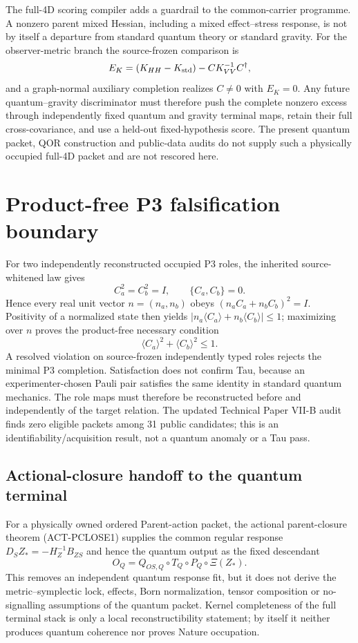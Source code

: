\documentclass[11pt]{article}
\begin{document}
The full-4D scoring compiler adds a guardrail to the common-carrier programme.
A nonzero parent mixed Hessian, including a mixed effect--stress response, is
not by itself a departure from standard quantum theory or standard gravity.
For the observer-metric branch the source-frozen comparison is
\[
 E_K=(K_{HH}-K_{\rm std})-CK_{VV}^{-1}C^\dagger,
\]
and a graph-normal auxiliary completion realizes \(C\neq0\) with \(E_K=0\).
Any future quantum--gravity discriminator must therefore push the complete
nonzero excess through independently fixed quantum and gravity terminal maps,
retain their full cross-covariance, and use a held-out fixed-hypothesis score.
The present quantum packet, QOR construction and public-data audits do not
supply such a physically occupied full-4D packet and are not rescored here.

\section{Product-free P3 falsification boundary}

For two independently reconstructed occupied P3 roles, the inherited
source-whitened law gives
\[
 C_a^2=C_b^2=I,\qquad \{C_a,C_b\}=0.
\]
Hence every real unit vector $n=(n_a,n_b)$ obeys
$(n_aC_a+n_bC_b)^2=I$. Positivity of a normalized state then yields
$|n_a\langle C_a\rangle+n_b\langle C_b\rangle|\leq1$; maximizing over $n$
proves the product-free necessary condition
\[
 \boxed{\langle C_a\rangle^2+\langle C_b\rangle^2\leq1.}
\]
A resolved violation on source-frozen independently typed roles rejects the
minimal P3 completion. Satisfaction does not confirm Tau, because an
experimenter-chosen Pauli pair satisfies the same identity in standard
quantum mechanics. The role maps must therefore be reconstructed before and
independently of the target relation. The updated Technical Paper VII-B
audit finds zero eligible packets among 31 public candidates; this is an
identifiability/acquisition result, not a quantum anomaly or a Tau pass.

\subsection*{Actional-closure handoff to the quantum terminal}

For a physically owned ordered Parent-action packet, the actional parent-closure theorem (ACT-PCLOSE1) supplies the
common regular response $D_SZ_*=-H_Z^{-1}B_{ZS}$ and hence the quantum output
as the fixed descendant
\[
 O_Q=Q_{OS,Q}\circ T_Q\circ P_Q\circ\Xi(Z_*).
\]
This removes an independent quantum response fit, but it does not derive the
metric--symplectic lock, effects, Born normalization, tensor composition or
no-signalling assumptions of the quantum packet.  Kernel completeness of the
full terminal stack is only a local reconstructibility statement; by itself
it neither produces quantum coherence nor proves Nature occupation.
\end{document}
